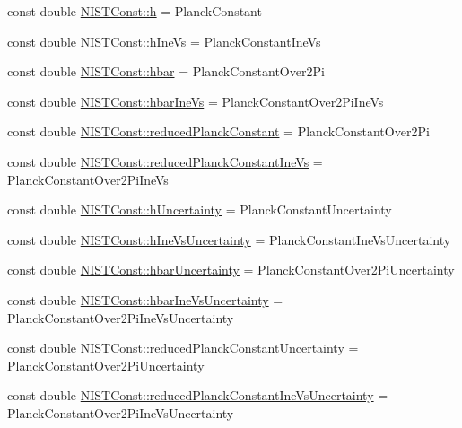 \begin{DoxyCompactItemize}
\item 
const double \hyperlink{group___planck_constant_ga772638524d12d0e8a63abb25441f87a9}{N\+I\+S\+T\+Const\+::h} = Planck\+Constant
\item 
const double \hyperlink{group___planck_constant_gabdd6f21b3e5325e4df4a021ee6b6a506}{N\+I\+S\+T\+Const\+::h\+Ine\+Vs} = Planck\+Constant\+Ine\+Vs
\item 
const double \hyperlink{group___planck_constant_gaec21867afdeb1950b150e667513cd842}{N\+I\+S\+T\+Const\+::hbar} = Planck\+Constant\+Over2\+Pi
\item 
const double \hyperlink{group___planck_constant_gacbb39d7d0090ed14cb725a1d6eaa3fd3}{N\+I\+S\+T\+Const\+::hbar\+Ine\+Vs} = Planck\+Constant\+Over2\+Pi\+Ine\+Vs
\item 
const double \hyperlink{group___planck_constant_ga91e80f15330603015f6f8f8e8f49c926}{N\+I\+S\+T\+Const\+::reduced\+Planck\+Constant} = Planck\+Constant\+Over2\+Pi
\item 
const double \hyperlink{group___planck_constant_gab9efdc081c1c1a03ca7a233d1589b1d8}{N\+I\+S\+T\+Const\+::reduced\+Planck\+Constant\+Ine\+Vs} = Planck\+Constant\+Over2\+Pi\+Ine\+Vs
\item 
const double \hyperlink{group___planck_constant_gaa3328612ae3a58889a270b440849b73a}{N\+I\+S\+T\+Const\+::h\+Uncertainty} = Planck\+Constant\+Uncertainty
\item 
const double \hyperlink{group___planck_constant_gadbf2b61fe6b0389e003a788047ad0c43}{N\+I\+S\+T\+Const\+::h\+Ine\+Vs\+Uncertainty} = Planck\+Constant\+Ine\+Vs\+Uncertainty
\item 
const double \hyperlink{group___planck_constant_ga2f2785d3e09a94615ed207e936f73f74}{N\+I\+S\+T\+Const\+::hbar\+Uncertainty} = Planck\+Constant\+Over2\+Pi\+Uncertainty
\item 
const double \hyperlink{group___planck_constant_ga58501029ba9f6b757d6d9992dfb56b4f}{N\+I\+S\+T\+Const\+::hbar\+Ine\+Vs\+Uncertainty} = Planck\+Constant\+Over2\+Pi\+Ine\+Vs\+Uncertainty
\item 
const double \hyperlink{group___planck_constant_ga723312692d243868ce31c9ac7172cab9}{N\+I\+S\+T\+Const\+::reduced\+Planck\+Constant\+Uncertainty} = Planck\+Constant\+Over2\+Pi\+Uncertainty
\item 
const double \hyperlink{group___planck_constant_ga90ccf5a0925f9ffdf8c289a7f2155482}{N\+I\+S\+T\+Const\+::reduced\+Planck\+Constant\+Ine\+Vs\+Uncertainty} = Planck\+Constant\+Over2\+Pi\+Ine\+Vs\+Uncertainty
\end{DoxyCompactItemize}


